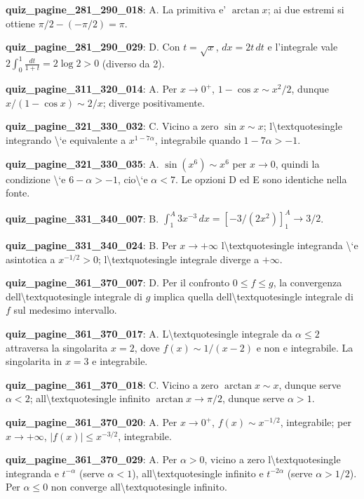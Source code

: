 \documentclass[11pt,a4paper]{article}
\newcounter{quiz}
\begin{document}
\noindent\textbf{quiz\_pagine\_281\_290\_018}: A. La primitiva e' $\arctan x$; ai due estremi si ottiene $\pi/2-(-\pi/2)=\pi$.\par\medskip
\noindent\textbf{quiz\_pagine\_281\_290\_029}: D. Con $t=\sqrt x$, $dx=2t\,dt$ e l'integrale vale $2\int_0^1\frac{dt}{1+t}=2\log2>0$ (diverso da 2).\par\medskip
\noindent\textbf{quiz\_pagine\_311\_320\_014}: A. Per $x\to0^+$, $1-\cos x\sim x^2/2$, dunque $x/(1-\cos x)\sim2/x$; diverge positivamente.\par\medskip
\noindent\textbf{quiz\_pagine\_321\_330\_032}: C. Vicino a zero $\sin x\sim x$; l\textbackslash{}textquotesingle integrando \textbackslash{}`e equivalente a $x^{1-7\alpha}$, integrabile quando $1-7\alpha>-1$.\par\medskip
\noindent\textbf{quiz\_pagine\_321\_330\_035}: A. $\sin(x^6)\sim x^6$ per $x\to0$, quindi la condizione \textbackslash{}`e $6-\alpha>-1$, cio\textbackslash{}`e $\alpha<7$. Le opzioni D ed E sono identiche nella fonte.\par\medskip
\noindent\textbf{quiz\_pagine\_331\_340\_007}: B. $\int_1^A3x^{-3}\,dx=[-3/(2x^2)]_1^A\to3/2$.\par\medskip
\noindent\textbf{quiz\_pagine\_331\_340\_024}: B. Per $x\to+\infty$ l\textbackslash{}textquotesingle integranda \textbackslash{}`e asintotica a $x^{-1/2}>0$; l\textbackslash{}textquotesingle integrale diverge a $+\infty$.\par\medskip
\noindent\textbf{quiz\_pagine\_361\_370\_007}: D. Per il confronto $0\leq f\leq g$, la convergenza dell\textbackslash{}textquotesingle integrale di $g$ implica quella dell\textbackslash{}textquotesingle integrale di $f$ sul medesimo intervallo.\par\medskip
\noindent\textbf{quiz\_pagine\_361\_370\_017}: A. L\textbackslash{}textquotesingle integrale da $\alpha\leq2$ attraversa la singolarita $x=2$, dove $f(x)\sim1/(x-2)$ e non e integrabile. La singolarita in $x=3$ e integrabile.\par\medskip
\noindent\textbf{quiz\_pagine\_361\_370\_018}: C. Vicino a zero $\arctan x\sim x$, dunque serve $\alpha<2$; all\textbackslash{}textquotesingle infinito $\arctan x\to\pi/2$, dunque serve $\alpha>1$.\par\medskip
\noindent\textbf{quiz\_pagine\_361\_370\_020}: A. Per $x\to0^+$, $f(x)\sim x^{-1/2}$, integrabile; per $x\to+\infty$, $|f(x)|\leq x^{-3/2}$, integrabile.\par\medskip
\noindent\textbf{quiz\_pagine\_361\_370\_029}: A. Per $\alpha>0$, vicino a zero l\textbackslash{}textquotesingle integranda e $t^{-\alpha}$ (serve $\alpha<1$), all\textbackslash{}textquotesingle infinito e $t^{-2\alpha}$ (serve $\alpha>1/2$). Per $\alpha\leq0$ non converge all\textbackslash{}textquotesingle infinito.\par\medskip
\end{document}
